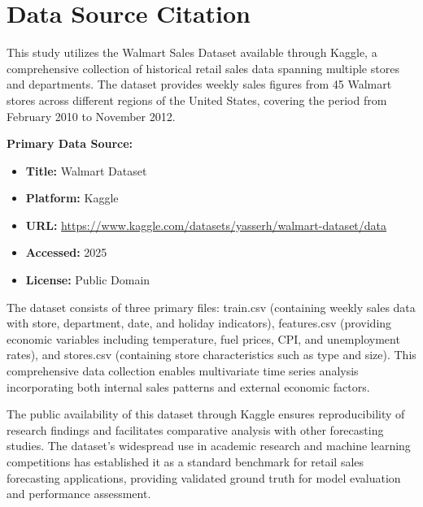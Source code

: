\section{Data Source Citation}

This study utilizes the Walmart Sales Dataset available through Kaggle, a comprehensive collection of historical retail sales data spanning multiple stores and departments. The dataset provides weekly sales figures from 45 Walmart stores across different regions of the United States, covering the period from February 2010 to November 2012.

\textbf{Primary Data Source:}
\begin{itemize}
	\item \textbf{Title:} Walmart Dataset
	\item \textbf{Platform:} Kaggle
	\item \textbf{URL:} \url{https://www.kaggle.com/datasets/yasserh/walmart-dataset/data}
	\item \textbf{Accessed:} 2025
	\item \textbf{License:} Public Domain
\end{itemize}

The dataset consists of three primary files: train.csv (containing weekly sales data with store, department, date, and holiday indicators), features.csv (providing economic variables including temperature, fuel prices, CPI, and unemployment rates), and stores.csv (containing store characteristics such as type and size). This comprehensive data collection enables multivariate time series analysis incorporating both internal sales patterns and external economic factors.

The public availability of this dataset through Kaggle ensures reproducibility of research findings and facilitates comparative analysis with other forecasting studies. The dataset's widespread use in academic research and machine learning competitions has established it as a standard benchmark for retail sales forecasting applications, providing validated ground truth for model evaluation and performance assessment.